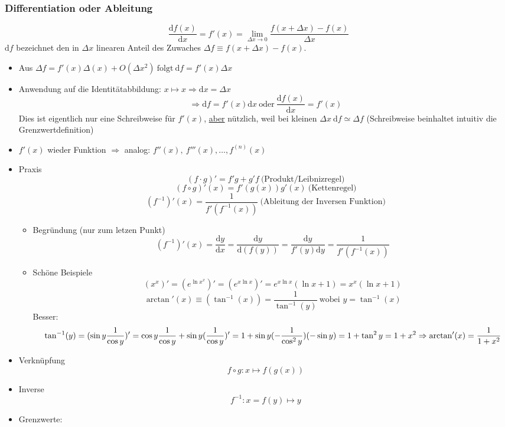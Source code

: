 \documentclass[11pt]{article}
\begin{document}
\subsubsection{Differentiation oder Ableitung}
\label{sec-1-2-2}
\[\frac{\mathrm{d}f(x)}{\mathrm{d}x} = f'(x) = \lim_{\Delta x \to 0} \frac{f(x + \Delta x) - f(x)}{\Delta x}\]
$\mathrm{d}f$ bezeichnet den in $\Delta x$ linearen Anteil des Zuwaches $\Delta f\equiv f(x + \Delta x) - f(x)$.
\begin{itemize}
\item Aus $\Delta f = f'(x)\Delta(x) + O(\Delta x^2)~\text{folgt}~\mathrm{d}f = f'(x)\Delta x$
\item Anwendung auf die Identitätabbildung: $x \mapsto x \Rightarrow \mathrm{d}x = \Delta x$
      \[\Rightarrow \mathrm{d}f = f'(x)\mathrm{d}x~\text{oder}~\frac{\mathrm{d}f(x)}{\mathrm{d}x} = f'(x)\]
      Dies ist eigentlich nur eine Schreibweise für $f'(x)$, \uline{aber} nützlich, weil bei kleinen $\Delta x~\mathrm{d}f \simeq \Delta f$ (Schreibweise beinhaltet intuitiv die Grenzwertdefinition)
\item $f'(x)$ wieder Funktion $\Rightarrow$ analog: $f''(x),~f'''(x),\ldots,f^{(n)}(x)$
\item Praxis
\[(f\cdot g)' = f' g + g' f~\text{(Produkt/Leibnizregel)}\]
\[(f \circ g)'(x) = f'(g(x))g'(x)~\text{(Kettenregel)}\]
\[(f^{-1})'(x) = \frac{1}{f'(f^{-1}(x))}~\text{(Ableitung der Inversen Funktion)}\]
\begin{itemize}
\item Begründung (nur zum letzen Punkt)
\[(f^{-1})'(x) = \frac{\mathrm{d}y}{\mathrm{d}x} = \frac{\mathrm{d}y}{\mathrm{d}(f(y))} = \frac{\mathrm{d}y}{f'(y)\mathrm{d}y} = \frac{1}{f'(f^{-1}(x))}\]
\item Schöne Beispiele
\[(x^x)' = (e^{\ln{x^x}})' = (e^{x\ln{x}})' = e^{x\ln{x}}(\ln{x} + 1) = x^x(\ln{x} + 1)\]
\[\arctan'(x) \equiv (\tan^{-1}(x)) = \frac{1}{\tan^{-1}(y)}~\text{wobei $y = \tan^{-1}(x)$}\]
Besser: \[\tan^{-1}(y) = (\sin{y} \frac{1}{\cos{y}})' = \cos{y} \frac{1}{\cos{y}} + \sin{y}(\frac{1}{\cos{y}})' = 1 + \sin{y}(-\frac{1}{\cos^2{y}})(-\sin{y}) = 1 + \tan^2{y} = 1 + x^2 \\ \Rightarrow \arctan'(x) = \frac{1}{1 + x^2}\]
\end{itemize}
\item Verknüpfung \[f\circ g: x\mapsto f(g(x))\]
\item Inverse \[f^{-1} : x=f(y)\mapsto y\]
\item Grenzwerte:
\begin{itemize}

\end{itemize}
\end{itemize}
\end{document}

